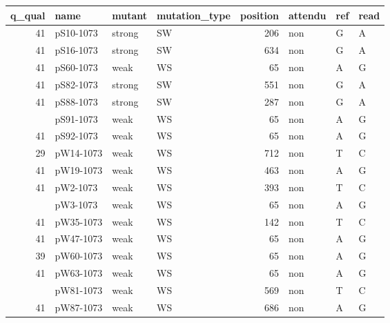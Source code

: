 
\begin{tabular}{rlllrlll}
\toprule
q\_qual & name & mutant & mutation\_type & position & attendu & ref & read\\
\midrule
41 & pS10-1073 & strong & SW & 206 & non & G & A\\
41 & pS16-1073 & strong & SW & 634 & non & G & A\\
41 & pS60-1073 & weak & WS & 65 & non & A & G\\
41 & pS82-1073 & strong & SW & 551 & non & G & A\\
41 & pS88-1073 & strong & SW & 287 & non & G & A\\
\addlinespace
41 & pS91-1073 & weak & WS & 65 & non & A & G\\
41 & pS92-1073 & weak & WS & 65 & non & A & G\\
29 & pW14-1073 & weak & WS & 712 & non & T & C\\
41 & pW19-1073 & weak & WS & 463 & non & A & G\\
41 & pW2-1073 & weak & WS & 393 & non & T & C\\
\addlinespace
28 & pW3-1073 & weak & WS & 65 & non & A & G\\
41 & pW35-1073 & weak & WS & 142 & non & T & C\\
41 & pW47-1073 & weak & WS & 65 & non & A & G\\
39 & pW60-1073 & weak & WS & 65 & non & A & G\\
41 & pW63-1073 & weak & WS & 65 & non & A & G\\
\addlinespace
41 & pW81-1073 & weak & WS & 569 & non & T & C\\
41 & pW87-1073 & weak & WS & 686 & non & A & G\\
\bottomrule
\end{tabular}
